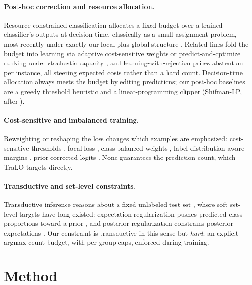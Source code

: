 \documentclass[letterpaper]{article} %
\begin{document}
\paragraph{Post-hoc correction and resource allocation.}
Resource-constrained classification allocates a fixed budget over a trained
classifier's outputs at decision time, classically as a small assignment
problem, most recently under exactly our local-plus-global structure
\citep{shifman2025classification}. Related lines fold the budget into
learning via adaptive cost-sensitive weights \citep{shifman2023adaptive} or
predict-and-optimize ranking under stochastic capacity
\citep{vanderschueren2024new}, and learning-with-rejection \citep{cortes2016learning}
prices abstention per instance, all steering expected costs rather than
a hard count. Decision-time
allocation always meets the budget by editing predictions; our
post-hoc baselines are a greedy threshold heuristic and a linear-programming clipper
(Shifman-LP, after \citealt{shifman2025classification}).

\paragraph{Cost-sensitive and imbalanced training.}
Reweighting or reshaping the loss changes which examples are
emphasized: cost-sensitive thresholds \citep{elkan2001foundations}, focal loss
\citep{lin2017focal}, class-balanced weights \citep{cui2019class},
label-distribution-aware margins \citep{cao2019learning}, prior-corrected logits
\citep{menon2020long}. None guarantees the prediction count, which TraLO targets directly.

\paragraph{Transductive and set-level constraints.}
Transductive inference reasons about a fixed unlabeled test set
\citep{vapnik1998statistical,joachims1999transductive}, where soft set-level targets
have long existed: expectation regularization pushes predicted class
proportions toward a prior \citep{mann2007simple}, and
posterior regularization constrains posterior expectations
\citep{ganchev2009posterior}. Our constraint is transductive
in this sense but \emph{hard}: an explicit argmax count budget, with per-group
caps, enforced during training.

\section{Method}
\label{sec:method}
\end{document}
